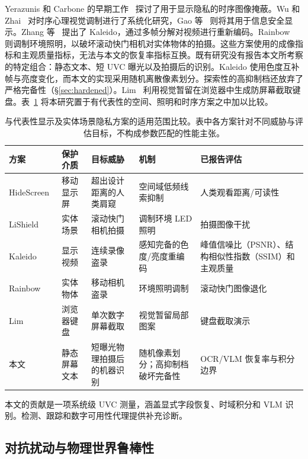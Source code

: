 \documentclass{ieeeaccess}
\begin{document}
Yerazunis 和 Carbone 的早期工作~\cite{b_yerazunis2001} 探讨了用于显示隐私的时序图像掩蔽。Wu 和 Zhai~\cite{b_wu2013} 对时序心理视觉调制进行了系统化研究，Gao 等~\cite{b_gao2014} 则将其用于信息安全显示。Zhang 等~\cite{b_kaleido2015} 提出了 Kaleido，通过多帧分解对视频进行重新编码。Rainbow~\cite{b_rainbow2018} 则调制环境照明，以破坏滚动快门相机对实体物体的拍摄。这些方案使用的成像指标和主观质量指标，无法与本文的恢复率指标互换。既有研究没有报告本文所考察的特定组合：静态文本、短 UVC 曝光以及拍摄后的识别。Kaleido 使用色度互补帧与亮度变化，而本文的实现采用随机离散像素划分。探索性的高抑制档还放弃了严格完备性（\S\ref{sec:hardened}）。Lim~\cite{b_lim2007} 利用视觉暂留在浏览器中生成防屏幕截取键盘。表~\ref{tab:kaleido_compare} 将本研究置于有代表性的空间、照明和时序方案之中加以比较。

\begin{table}[!t]
\caption{与代表性显示及实体场景隐私方案的适用范围比较。表中各方案针对不同威胁与评估目标，不构成参数匹配的性能主张。}
\label{tab:kaleido_compare}
\centering
\footnotesize
\setlength{\tabcolsep}{3.2pt}
\begin{tabular}{p{}p{}p{}p{}p{}}
\toprule
方案 & 保护介质 & 目标威胁 & 机制 & 已报告评估 \\
\midrule
HideScreen~\cite{b_hidescreen2019} & 移动显示屏 & 超出设计距离的人类肩窥 & 空间域低频线索抑制 & 人类观看距离/可读性 \\
LiShield~\cite{b_zhu2017} & 实体场景 & 滚动快门相机拍摄 & 调制环境 LED 照明 & 拍摄图像干扰 \\
Kaleido~\cite{b_kaleido2015} & 显示视频 & 连续录像盗录 & 感知完备的色度/亮度重编码 & 峰值信噪比（PSNR）、结构相似性指数（SSIM）和主观质量 \\
Rainbow~\cite{b_rainbow2018} & 实体物体 & 移动相机盗录 & 环境照明调制 & 滚动快门图像退化 \\
Lim~\cite{b_lim2007} & 浏览器键盘 & 单次数字屏幕截取 & 视觉暂留局部图案 & 键盘截取演示 \\
本文 & 静态屏幕文本 & 短曝光物理拍摄后的机器识别 & 随机像素划分；高抑制档破坏完备性 & OCR/VLM 恢复率与积分边界 \\
\bottomrule
\end{tabular}
\end{table}

本文的贡献是一项系统级 UVC 测量，涵盖显式字段恢复、时域积分和 VLM 识别。检测、跟踪和数字可用性代理提供补充诊断。

\subsection{对抗扰动与物理世界鲁棒性}
\end{document}
